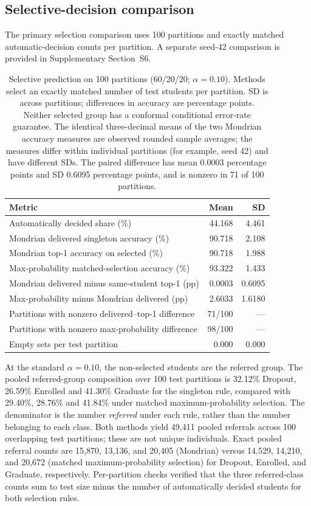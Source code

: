 \subsection{Selective-decision comparison}\label{sec:triage}

The primary selection comparison uses 100 partitions and exactly matched
automatic-decision counts per partition. A separate seed-42 comparison is
provided in Supplementary Section~S6.

\begin{table}[htbp]
\centering
\caption{Selective prediction on 100 partitions (60/20/20; $\alpha=0.10$).
Methods select an exactly matched number of test students per partition.
SD is across partitions; differences in accuracy are percentage points.
Neither selected group has a conformal conditional error-rate guarantee.
The identical three-decimal means of the two Mondrian accuracy measures
are observed rounded sample averages; the measures differ within individual
partitions (for example, seed 42) and have different SDs. The paired difference has mean 0.0003
percentage points and SD 0.6095 percentage points, and is nonzero in 71 of
100 partitions.}
\label{tab:triage}
\begin{tabular}{lrr}
\toprule
Metric & Mean & SD\\
\midrule
Automatically decided share (\%) & 44.168 & 4.461\\
Mondrian delivered singleton accuracy (\%) & 90.718 & 2.108\\
Mondrian top-1 accuracy on selected (\%) & 90.718 & 1.988\\
Max-probability matched-selection accuracy (\%) & 93.322 & 1.433\\
Mondrian delivered minus same-student top-1 (pp) & 0.0003 & 0.6095\\
Max-probability minus Mondrian delivered (pp) & 2.6033 & 1.6180\\
Partitions with nonzero delivered--top-1 difference & 71/100 & ---\\
Partitions with nonzero max-probability difference & 98/100 & ---\\
Empty sets per test partition & 0.000 & 0.000\\
\bottomrule
\end{tabular}
\end{table}

At the standard $\alpha=0.10$, the non-selected students are the referred
group. The pooled referred-group composition over 100 test partitions is
32.12\% Dropout, 26.59\% Enrolled and 41.30\% Graduate for the
singleton rule, compared with 29.40\%, 28.76\% and 41.84\% under matched
maximum-probability selection. The denominator is the number \emph{referred}
under each rule, rather than the number belonging to each class. Both methods
yield 49,411 pooled referrals across 100 overlapping test partitions; these
are not unique individuals. Exact pooled referral counts are 15,870, 13,136,
and 20,405 (Mondrian) versus 14,529, 14,210, and 20,672 (matched
maximum-probability selection) for Dropout, Enrolled, and Graduate,
respectively. Per-partition checks verified that the three referred-class
counts sum to test size minus the number of automatically decided students
for both selection rules.

